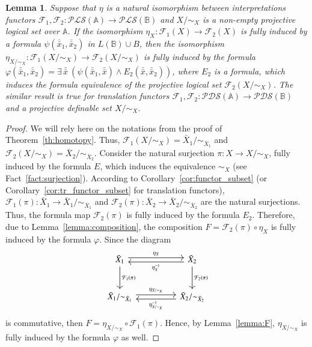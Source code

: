 \documentclass[12pt]{article}
\newtheorem{lemma}{Lemma}
\theoremstyle{definition}
\def\MA{{\mathbb{A}}}
\def\MB{{\mathbb{B}}}
\def\F{{\mathcal{F}}}
\def\PLS{{\mathcal{PLS}}}
\def\PDS{{\mathcal{PDS}}}
\begin{document}
\begin{lemma}\label{le:natur_iso6}
Suppose that $\eta$ is a natural isomorphism between interpretations functors $\F_1,\F_2\colon \PLS(\MA)\to \PLS(\MB)$ and $X/{\sim_X}$ is a non-empty projective logical set over $\MA$. If the isomorphism $\eta_X\colon \F_1(X)\to \F_2(X)$ is fully induced by a formula $\psi(\bar{\bar x}_1,\bar{\bar x}_2)$ in $L(\MB)\cup B$, then the isomorphism $\eta_{X/{\sim_X}}\colon \F_1(X/{\sim_X})\to \F_2(X/{\sim_X})$ is fully induced by the formula $\varphi(\bar{\bar x}_1,\bar{\bar x}_2)=\exists \, \bar{\bar x}\:(\psi(\bar{\bar x}_1,\bar{\bar x})\wedge E_2(\bar{\bar x},\bar{\bar x}_2))$, where $E_2$ is a formula, which induces the formula equivalence of the projective logical set $\F_2(X/{\sim_X})$. The similar result is true for translation functors $\F_1,\F_2\colon \PDS(\MA)\to \PDS(\MB)$ and a projective definable set $X/{\sim_X}$. 
\end{lemma}

\begin{proof}
We will rely here on the notations from the proof of Theorem~\ref{th:homotopy}. Thus, $\F_1(X/{\sim_X})=\bar X_1/{\sim_{\bar X_1}}$ and $\F_2(X/{\sim_X})=\bar X_2/{\sim_{\bar X_2}}$. Consider the natural surjection $\pi\colon X\to X/{\sim_X}$, fully induced by the formula $E$, which induces the equivalence $\sim_X$ (see Fact~\ref{fact:surjection}). According to Corollary~\ref{cor:functor_subset} (or Corollary~\ref{cor:tr_functor_subset} for translation functors), $\F_1(\pi)\colon \bar X_1\to \bar X_1/{\sim_{\bar X_1}}$ and $\F_2(\pi)\colon \bar X_2\to \bar X_2/{\sim_{\bar X_2}}$ are the natural surjections. Thus, the formula map $\F_2(\pi)$ is fully induced by the formula $E_2$. Therefore, due to Lemma~\ref{lemma:composition}, the composition $F=\F_2(\pi)\circ\eta_X$ is fully induced by the formula $\varphi$. Since the  diagram
\begin{equation*}
\begin{tikzcd}[column sep=huge, row sep=large]
\bar X_1 
\arrow[r,leftarrow,shift right,"\eta_{X}^{-1}"']
\arrow[r,rightarrow,shift left,swap,"\eta_{X}"'] 
\arrow{d}{\F_1(\pi)} 
& \bar X_2
\arrow{d}{\F_2(\pi)}\\
\bar X_1/{\sim_{\bar X_1}}  
\arrow[r,leftarrow,shift right,"\eta_{X/{\sim_X}}^{-1}"']
\arrow[r,rightarrow,shift left,swap,"\eta_{X/{\sim_X}}"']  
& \bar X_2/{\sim_{\bar X_2}}
\end{tikzcd}    
\end{equation*}
is commutative, then  $F=\eta_{X/{\sim_X}}\circ\F_1(\pi)$. Hence, by Lemma~\ref{lemma:F}, $\eta_{X/{\sim_X}}$ is fully induced by the formula $\varphi$ as well.   
\end{proof}
\end{document}
